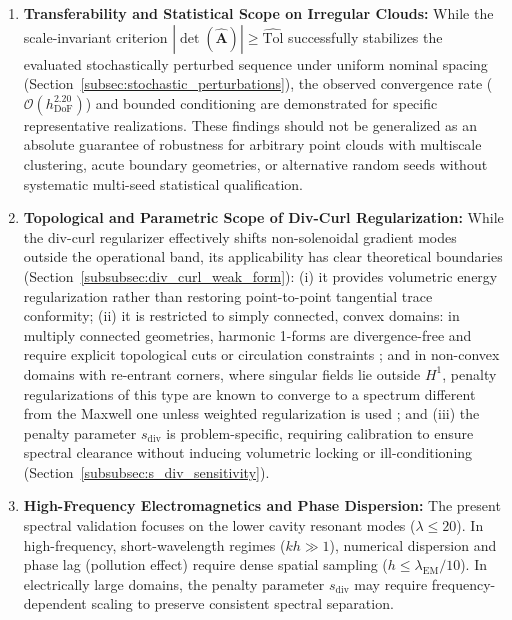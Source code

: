 \documentclass[preprint,12pt]{elsarticle}
\begin{document}
\begin{enumerate}
    \item \textbf{Transferability and Statistical Scope on Irregular Clouds:}
          While the scale-invariant criterion $|\det(\widehat{\mathbf{A}})| \ge \widehat{\mathrm{Tol}}$ successfully stabilizes the evaluated stochastically perturbed sequence under uniform nominal spacing (Section~\ref{subsec:stochastic_perturbations}), the observed convergence rate ($\mathcal{O}(h_{\mathrm{DoF}}^{2.20})$) and bounded conditioning are demonstrated for specific representative realizations. These findings should not be generalized as an absolute guarantee of robustness for arbitrary point clouds with multiscale clustering, acute boundary geometries, or alternative random seeds without systematic multi-seed statistical qualification.

    \item \textbf{Topological and Parametric Scope of Div-Curl Regularization:}
          While the div-curl regularizer effectively shifts non-solenoidal gradient modes outside the operational band, its applicability has clear theoretical boundaries (Section~\ref{subsubsec:div_curl_weak_form}):
          (i) it provides volumetric energy regularization rather than restoring point-to-point tangential trace conformity;
          (ii) it is restricted to simply connected, convex domains: in multiply connected geometries, harmonic 1-forms are divergence-free and require explicit topological cuts or circulation constraints \cite{bossavit1998computational, monk2003finite, gross2004electromagnetic}; and in non-convex domains with re-entrant corners, where singular fields lie outside $H^1$, penalty regularizations of this type are known to converge to a spectrum different from the Maxwell one unless weighted regularization is used \cite{costabel1991coercive, costabel2002weighted}; and
          (iii) the penalty parameter $s_{\mathrm{div}}$ is problem-specific, requiring calibration to ensure spectral clearance without inducing volumetric locking or ill-conditioning (Section~\ref{subsubsec:s_div_sensitivity}).

    \item \textbf{High-Frequency Electromagnetics and Phase Dispersion:}
          The present spectral validation focuses on the lower cavity resonant modes ($\lambda \le 20$). In high-frequency, short-wavelength regimes ($kh \gg 1$), numerical dispersion and phase lag (pollution effect) \cite{jin2014finite} require dense spatial sampling ($h \le \lambda_{\mathrm{EM}} / 10$). In electrically large domains, the penalty parameter $s_{\mathrm{div}}$ may require frequency-dependent scaling to preserve consistent spectral separation.


\end{enumerate}
\end{document}
